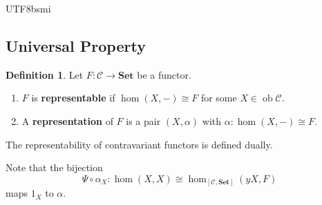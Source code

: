 \documentclass[12pt]{article}
\theoremstyle{definition}
\newtheorem{definition}{Definition}[section]
\newtheorem{corollary}[definition]{Corollary}
\newcommand\<{\langle}
\renewcommand\>{\rangle}
\DeclareMathOperator{\Sym}{Sym}
\DeclareMathOperator{\ob}{ob}
\begin{document}
\begin{CJK}{UTF8}{bsmi}

\subsection{Universal Property}

\begin{definition}
    Let $F:\mathcal{C}\to\textbf{Set}$ be a functor.
    \begin{enumerate}
        \item $F$ is \textbf{representable} if $\hom(X, -)\cong F$ for some $X\in\ob\mathcal{C}$.
        \item A \textbf{representation} of $F$ is a pair $(X, \alpha)$ with $\alpha:\hom(X, -)\cong F$.
    \end{enumerate}
    The representability of contravariant functors is defined dually.
\end{definition}

Note that the bijection 
\[
    \Psi\circ\alpha_X:\hom(X, X)\cong \hom_{[\mathcal{C}, \textbf{Set}]}(yX, F)
\]
maps $1_X$ to $\alpha$.

    

\end{CJK}
\end{document}

